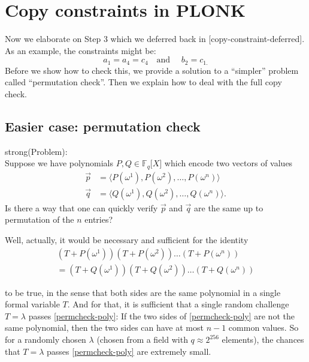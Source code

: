 \section{Copy constraints in PLONK}\label{copy-constraints}

Now we elaborate on Step 3 which we deferred back in
{[}copy-constraint-deferred{]}. As an example, the constraints might be:
\[a_{1} = a_{4} = c_{4}\quad\text{and }\quad b_{2} = c_{1.}\] Before we
show how to check this, we provide a solution to a ``simpler'' problem
called ``permutation check''. Then we explain how to deal with the full
copy check.

\subsection{Easier case: permutation check}

strong(Problem):\\
Suppose we have polynomials \(P,Q \in {\mathbb{F}}_{q}\lbrack X\rbrack\)
which encode two vectors of values \[\begin{aligned}
\overset{\rightarrow}{p} & = \langle P\left( \omega^{1} \right),P\left( \omega^{2} \right),\ldots,P\left( \omega^{n} \right)\rangle \\
\overset{\rightarrow}{q} & = \langle Q\left( \omega^{1} \right),Q\left( \omega^{2} \right),\ldots,Q\left( \omega^{n} \right)\rangle.
\end{aligned}\] Is there a way that one can quickly verify
\(\overset{\rightarrow}{p}\) and \(\overset{\rightarrow}{q}\) are the
same up to permutation of the \(n\) entries?

Well, actually, it would be necessary and sufficient for the identity
\[\begin{array}{r}
\left( T + P\left( \omega^{1} \right) \right)\left( T + P\left( \omega^{2} \right) \right)\ldots\left( T + P\left( \omega^{n} \right) \right) \\
 = \left( T + Q\left( \omega^{1} \right) \right)\left( T + Q\left( \omega^{2} \right) \right)\ldots\left( T + Q\left( \omega^{n} \right) \right)
\end{array}\] \label{permcheck-poly}{}

to be true, in the sense that both sides are the same polynomial in a
single formal variable \(T\). And for that, it is sufficient that a
single random challenge \(T = \lambda\) passes
\hyperref[permcheck-poly]{{[}permcheck-poly{]}}: If the two sides of
\hyperref[permcheck-poly]{{[}permcheck-poly{]}} are not the same
polynomial, then the two sides can have at most \(n - 1\) common values.
So for a randomly chosen \(\lambda\) (chosen from a field with
\(q \approx 2^{256}\) elements), the chances that \(T = \lambda\) passes
\hyperref[permcheck-poly]{{[}permcheck-poly{]}} are extremely small.

